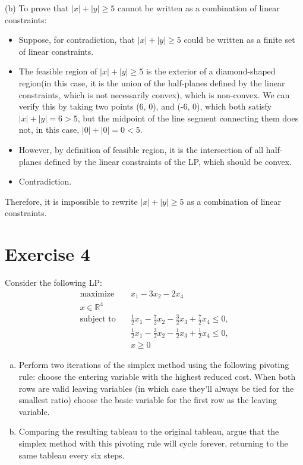 \documentclass{article}
\begin{document}
(b) To prove that $|x| + |y| \geq 5$ cannot be written as a combination of linear constraints:

\begin{itemize}
\item Suppose, for contradiction, that $|x| + |y| \geq 5$ could be written as a finite set of linear constraints.
\item The feasible region of $|x| + |y| \geq 5$ is the exterior of a diamond-shaped region(in this case, it is the union of the half-planes defined by the linear constraints, which is not necessarily convex), which is non-convex. We can verify this by taking two points (6, 0), and (-6, 0), which both satisfy $|x| + |y| = 6 > 5$, but the midpoint of the line segment connecting them does not, in this case, $|0| + |0| = 0 < 5$.
\item However, by definition of feasible region, it is the intersection of all half-planes defined by the linear constraints of the LP, which should be convex.
\item Contradiction.
\end{itemize}
Therefore, it is impossible to rewrite $|x| + |y| \geq 5$ as a combination of linear constraints.

\newpage

\section*{Exercise 4}
Consider the following LP:
\begin{align*}
\text{maximize} \quad & x_1 - 3x_2 - 2x_4 \\
x \in \mathbb{R}^4 \\
\text{subject to} \quad & \frac{1}{2}x_1 - \frac{7}{2}x_2 - \frac{3}{2}x_3 + \frac{7}{2}x_4 \leq 0, \\
& \frac{1}{2}x_1 - \frac{3}{2}x_2 - \frac{1}{2}x_3 + \frac{1}{2}x_4 \leq 0, \\
& x \geq 0
\end{align*}

\begin{enumerate}[(a)]
\item Perform two iterations of the simplex method using the following pivoting rule: choose the entering variable with the highest reduced cost. When both rows are valid leaving variables (in which case they'll always be tied for the smallest ratio) choose the basic variable for the first row as the leaving variable.
\item Comparing the resulting tableau to the original tableau, argue that the simplex method with this pivoting rule will cycle forever, returning to the same tableau every six steps.
\end{enumerate}
\end{document}
